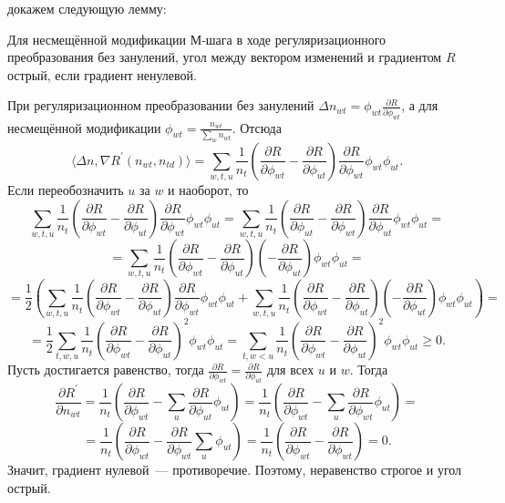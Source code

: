 \documentclass[12pt, twoside]{article}
\begin{document}
 докажем следующую лемму:
\begin{Lemma}           
Для несмещённой модификации М-шага в ходе регуляризационного преобразования  без занулений, угол  между вектором изменений и градиентом $R$ острый, если градиент ненулевой.
\end{Lemma}
\begin{Proof}
При регуляризационном преобразовании без занулений $\Delta n_{wt} =  \phi_{wt} \frac{\partial{R}}{\partial{\phi_{wt}}}$, а для несмещённой модификации $\phi_{wt} = \frac{n_{wt}}{\sum\limits_w n_{wt}}$. Отсюда
\[
\langle \Delta n, \nabla R^{\prime}(n_{wt}, n_{td})\rangle = \sum\limits_{w, t, u}  \frac{1}{n_{t}}  \left(  \frac{\partial{R}}{\partial{\phi_{wt}}}  -  \frac{\partial{R}}{\partial{\phi_{ut}}}  \right)  \frac{\partial{R}}{\partial{\phi_{wt}}} \phi_{wt} \phi_{ut}.
\]
Если переобозначить $u$ за $w$ и наоборот, то 
\[
\sum\limits_{w, t, u}  \frac{1}{n_{t}}  \left(  \frac{\partial{R}}{\partial{\phi_{wt}}}  -  \frac{\partial{R}}{\partial{\phi_{ut}}}  \right)  \frac{\partial{R}}{\partial{\phi_{wt}}} \phi_{wt} \phi_{ut}  = \sum\limits_{w, t, u}  \frac{1}{n_{t}}  \left(  \frac{\partial{R}}{\partial{\phi_{ut}}}  -  \frac{\partial{R}}{\partial{\phi_{wt}}}  \right)  \frac{\partial{R}}{\partial{\phi_{ut}}} \phi_{wt} \phi_{ut} = 
\]
\[
= \sum\limits_{w, t, u}  \frac{1}{n_{t}}  \left(  \frac{\partial{R}}{\partial{\phi_{wt}}}  -  \frac{\partial{R}}{\partial{\phi_{ut}}}  \right)  \left(-\frac{\partial{R}}{\partial{\phi_{ut}}}\right) \phi_{wt} \phi_{ut} = 
\]
\[
= \frac12 \left(\sum\limits_{w, t, u}  \frac{1}{n_{t}}  \left(  \frac{\partial{R}}{\partial{\phi_{wt}}}  -  \frac{\partial{R}}{\partial{\phi_{ut}}}  \right)  \frac{\partial{R}}{\partial{\phi_{wt}}} \phi_{wt} \phi_{ut} +  \sum\limits_{w, t, u}  \frac{1}{n_{t}}  \left(  \frac{\partial{R}}{\partial{\phi_{wt}}}  -  \frac{\partial{R}}{\partial{\phi_{ut}}}  \right)  \left(-\frac{\partial{R}}{\partial{\phi_{ut}}}\right) \phi_{wt} \phi_{ut} \right)= 
\]
\[
= \frac12 \sum\limits_{t, w, u}  \frac{1}{n_{t}} \left(  \frac{\partial{R}}{\partial{\phi_{wt}}}  -  \frac{\partial{R}}{\partial{\phi_{ut}}}  \right)^2 \phi_{wt} \phi_{ut} = \sum\limits_{t, w < u}  \frac{1}{n_{t}} \left(  \frac{\partial{R}}{\partial{\phi_{wt}}}  -  \frac{\partial{R}}{\partial{\phi_{ut}}}  \right)^2 \phi_{wt} \phi_{ut} \geq 0.
\]
Пусть достигается равенство, тогда $\frac{\partial{R}}{\partial{\phi_{wt}}}  =  \frac{\partial{R}}{\partial{\phi_{ut}}}$ для всех $u$ и $w$. Тогда
\[
\frac{\partial{R^{\prime}}}{\partial{n_{wt}}} = \frac{1}{n_t} \left( \frac{\partial{R}}{\partial{\phi_{wt}}} - \sum_{u}  \frac{\partial{R}}{\partial{\phi_{ut}}} \phi_{ut} \right) = \frac{1}{n_t} \left( \frac{\partial{R}}{\partial{\phi_{wt}}} - \sum_{u}  \frac{\partial{R}}{\partial{\phi_{wt}}} \phi_{ut} \right) =
\]
\[
=\frac{1}{n_t} \left( \frac{\partial{R}}{\partial{\phi_{wt}}} - \frac{\partial{R}}{\partial{\phi_{wt}}} \sum_{u} \phi_{ut} \right)  = \frac{1}{n_t} \left( \frac{\partial{R}}{\partial{\phi_{wt}}} - \frac{\partial{R}}{\partial{\phi_{wt}}} \right) = 0.
\]
Значит, градиент нулевой~--- противоречие. Поэтому, неравенство строгое и угол острый.
\end{Proof}
\medskip
\end{document}
